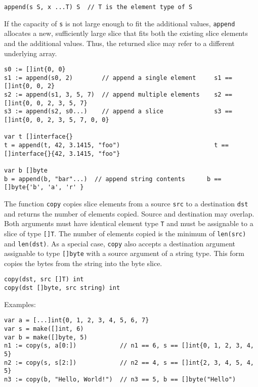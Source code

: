 \begin{Verbatim}[frame=single]
append(s S, x ...T) S  // T is the element type of S
\end{Verbatim}

If the capacity of \texttt{s} is not large enough to fit the additional
values, \texttt{append} allocates a new, sufficiently large slice that
fits both the existing slice elements and the additional values. Thus,
the returned slice may refer to a different underlying array.

\begin{Verbatim}[frame=single]
s0 := []int{0, 0}
s1 := append(s0, 2)        // append a single element     s1 == []int{0, 0, 2}
s2 := append(s1, 3, 5, 7)  // append multiple elements    s2 == []int{0, 0, 2, 3, 5, 7}
s3 := append(s2, s0...)    // append a slice              s3 == []int{0, 0, 2, 3, 5, 7, 0, 0}

var t []interface{}
t = append(t, 42, 3.1415, "foo")                          t == []interface{}{42, 3.1415, "foo"}

var b []byte
b = append(b, "bar"...)  // append string contents      b == []byte{'b', 'a', 'r' }
\end{Verbatim}

The function \texttt{copy} copies slice elements from a source
\texttt{src} to a destination \texttt{dst} and returns the number of
elements copied. Source and destination may overlap. Both arguments must
have identical element type \texttt{T} and
must be assignable to a slice of type
\texttt{{[}{]}T}. The number of elements copied is the minimum of
\texttt{len(src)} and \texttt{len(dst)}. As a special case,
\texttt{copy} also accepts a destination argument assignable to type
\texttt{{[}{]}byte} with a source argument of a string type. This form
copies the bytes from the string into the byte slice.

\begin{Verbatim}[frame=single]
copy(dst, src []T) int
copy(dst []byte, src string) int
\end{Verbatim}

Examples:

\begin{Verbatim}[frame=single]
var a = [...]int{0, 1, 2, 3, 4, 5, 6, 7}
var s = make([]int, 6)
var b = make([]byte, 5)
n1 := copy(s, a[0:])            // n1 == 6, s == []int{0, 1, 2, 3, 4, 5}
n2 := copy(s, s[2:])            // n2 == 4, s == []int{2, 3, 4, 5, 4, 5}
n3 := copy(b, "Hello, World!")  // n3 == 5, b == []byte("Hello")
\end{Verbatim}

